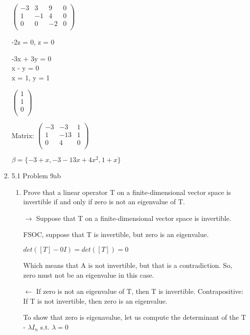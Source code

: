 \documentclass[12pt]{article}
\begin{document}
\begin{enumerate}
        $\begin{pmatrix}
                -3 & 3 & 9 & 0\\
                1 & -1 & 4 & 0\\
                0 & 0 & -2 & 0\\
            \end{pmatrix}$

        -2z = 0, z = 0

        -3x + 3y = 0 \\
        x - y = 0 \\

        x = 1, y = 1

        $\begin{pmatrix}
            1 \\
            1 \\
            0\\
        \end{pmatrix}$

        Matrix: 
        $\begin{pmatrix}
            -3 & -3 & 1 \\
            1 & -13 & 1\\
            0 & 4 & 0\\
        \end{pmatrix}$
        
        $\beta = \{-3 + x, -3 - 13x + 4x^2, 1 + x\}$
    \item 5.1 Problem 9ab
    \begin{enumerate}[label=(\alph*)]
        \item Prove that a linear operator T on a finite-dimensional vector space is invertible if and only if zero is not an eigenvalue of T. 

        $\rightarrow$ Suppose that T on a finite-dimensional vector space is invertible. 

        FSOC, suppose that T is invertible, but zero is an eigenvalue. 

        $det([T] - 0I) = det([T]) = 0$ 

        Which means that A is not invertible, but that is a contradiction. So, zero must not be an eigenvalue in this case.

        $\leftarrow$ If zero is not an eigenvalue of T, then T is invertible. 
        Contrapositive: If T is not invertible, then zero is an eigenvalue. 

        To show that zero is eigenavalue, let us compute the determinant of the T - $\lambda I_n$  s.t. $\lambda = 0$
        

\end{enumerate}
\end{enumerate}
\end{document}
